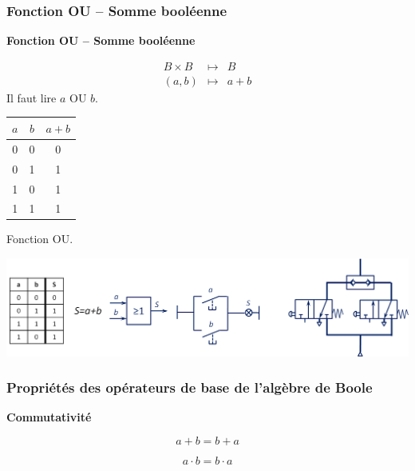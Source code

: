 \documentclass[10pt]{article}
\begin{document}
\subsubsection{Fonction OU -- Somme booléenne}


\begin{defi}
\textbf{Fonction OU -- Somme booléenne}

\begin{minipage}[c]{.45\linewidth}
\begin{eqnarray*}
B \times B &\longmapsto& B\\
(a,b) &\longmapsto& a + b
\end{eqnarray*}
Il faut lire $a$ OU $b$. 
\end{minipage} \hfill
\begin{minipage}[c]{.45\linewidth}
\begin{center}
\begin{tabular}{|c|c||c|}
\hline
$a$ & $b$ & $a+ b$ \\
\hline
0 & 0 & 0 \\ \hline
0 & 1 & 1 \\ \hline
1 & 0 & 1 \\ \hline
1 & 1 & 1 \\ \hline
\end{tabular}
\end{center}
\end{minipage}
\end{defi}

\begin{exemple}
Fonction OU.


\begin{center}
\includegraphics[width=.9\textwidth]{images/OU}
\end{center}
\end{exemple}

\subsubsection{Propriétés des opérateurs de base de l'algèbre de Boole}

\begin{prop}
\textbf{Commutativité}

\begin{minipage}[c]{.45\linewidth}
$$ a+b = b+a$$
\end{minipage}\hfill
\begin{minipage}[c]{.45\linewidth}
$$ a\cdot b = b\cdot a$$
\end{minipage}
\end{prop}
\end{document}
